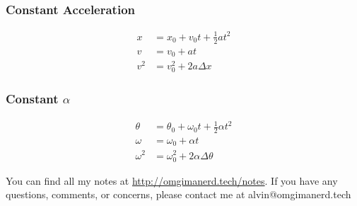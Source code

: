 \documentclass{math}
\begin{document}
\subsubsection*{Constant Acceleration}
\begin{align*}
  x &= x_0+v_0t+\frac{1}{2}at^2 \\
  v &= v_0+at \\
  v^2 &= v_0^2+2a\Delta x
\end{align*}

\subsubsection*{Constant \( \alpha \)}
\begin{align*}
  \theta &= \theta_0+\omega_0t+\frac{1}{2}\alpha t^2 \\
  \omega &= \omega_0+\alpha t \\
  \omega^2 &= \omega_0^2+2\alpha\Delta\theta
\end{align*}

\begin{center}
  You can find all my notes at \url{http://omgimanerd.tech/notes}. If you have
  any questions, comments, or concerns, please contact me at
  alvin@omgimanerd.tech
\end{center}
\end{document}
